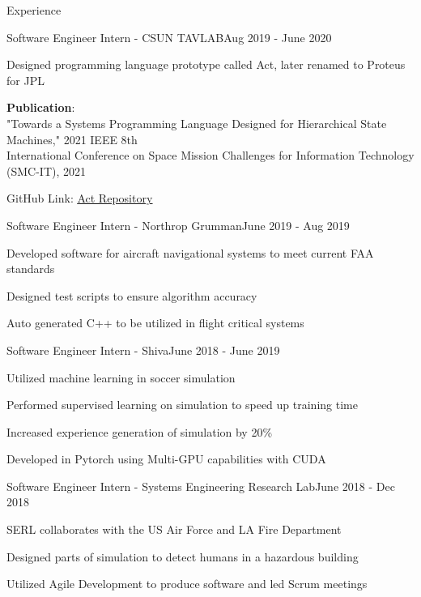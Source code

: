 \documentclass{resume}
\begin{document}
\begin{rSection}{Experience}
\begin{rSubsection}{Software Engineer Intern - CSUN TAVLAB}{Aug 2019 - June 2020}
        \item Designed programming language prototype called Act, later renamed to Proteus for JPL
        \item \textbf{Publication}: \\
          "Towards a Systems Programming Language Designed for Hierarchical State Machines," 2021 IEEE 8th \\
          \quad International Conference on Space Mission Challenges for Information Technology (SMC-IT), 2021
        \item GitHub Link: \href{https://github.com/csun-comp430-s20/act}{\color{blue}\underline{Act Repository}}
    \end{rSubsection}
    \begin{rSubsection}{Software Engineer Intern - Northrop Grumman}{June 2019 - Aug 2019}
        \item Developed software for aircraft navigational systems to meet current FAA standards
        \item Designed test scripts to ensure algorithm accuracy
        \item Auto generated C++ to be utilized in flight critical systems
    \end{rSubsection}
    \begin{rSubsection}{Software Engineer Intern - Shiva}{June 2018 - June 2019}
        \item Utilized machine learning in soccer simulation
        \item Performed supervised learning on simulation to speed up training time
        \item Increased experience generation of simulation by 20\%
        \item Developed in Pytorch using Multi-GPU capabilities with CUDA
    \end{rSubsection}
    \begin{rSubsection}{Software Engineer Intern - Systems Engineering Research Lab}{June 2018 - Dec 2018}
        \item SERL collaborates with the US Air Force and LA Fire Department
        \item Designed parts of simulation to detect humans in a hazardous building
        \item Utilized Agile Development to produce software and led Scrum meetings
    \end{rSubsection}
\end{rSection}
\end{document}

